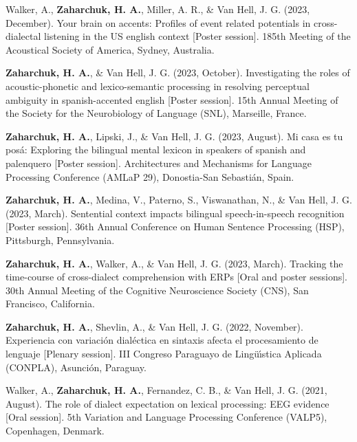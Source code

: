 \documentclass[11pt,a4paper,]{awesome-cv}
\begin{document}
\leavevmode{}%
Walker, A., \textbf{\textbf{Zaharchuk, H.} A.}, Miller, A. R., \& Van Hell, J. G. (2023,
December). Your brain on accents: Profiles of event related potentials
in cross-dialectal listening in the US english context {[}Poster
session{]}. 185th Meeting of the Acoustical Society of America, Sydney,
Australia.

\leavevmode{}%
\textbf{\textbf{Zaharchuk, H.} A.}, \& Van Hell, J. G. (2023, October). Investigating the
roles of acoustic-phonetic and lexico-semantic processing in resolving
perceptual ambiguity in spanish-accented english {[}Poster session{]}.
15th Annual Meeting of the Society for the Neurobiology of Language
(SNL), Marseille, France.

\leavevmode{}%
\textbf{\textbf{Zaharchuk, H.} A.}, Lipski, J., \& Van Hell, J. G. (2023, August). Mi casa
es tu posá: Exploring the bilingual mental lexicon in speakers of
spanish and palenquero {[}Poster session{]}. Architectures and
Mechanisms for Language Processing Conference (AMLaP 29), Donostia-San
Sebastián, Spain.

\leavevmode{}%
\textbf{\textbf{Zaharchuk, H.} A.}, Medina, V., Paterno, S., Viswanathan, N., \& Van Hell,
J. G. (2023, March). Sentential context impacts bilingual
speech-in-speech recognition {[}Poster session{]}. 36th Annual
Conference on Human Sentence Processing (HSP), Pittsburgh, Pennsylvania.

\leavevmode{}%
\textbf{\textbf{Zaharchuk, H.} A.}, Walker, A., \& Van Hell, J. G. (2023, March). Tracking
the time-course of cross-dialect comprehension with ERPs {[}Oral and
poster sessions{]}. 30th Annual Meeting of the Cognitive Neuroscience
Society (CNS), San Francisco, California.

\leavevmode{}%
\textbf{\textbf{Zaharchuk, H.} A.}, Shevlin, A., \& Van Hell, J. G. (2022, November).
Experiencia con variación dialéctica en sintaxis afecta el procesamiento
de lenguaje {[}Plenary session{]}. III Congreso Paraguayo de Lingüı́stica
Aplicada (CONPLA), Asunción, Paraguay.

\leavevmode{}%
Walker, A., \textbf{\textbf{Zaharchuk, H.} A.}, Fernandez, C. B., \& Van Hell, J. G.
(2021, August). The role of dialect expectation on lexical processing:
EEG evidence {[}Oral session{]}. 5th Variation and Language Processing
Conference (VALP5), Copenhagen, Denmark.
\end{document}
